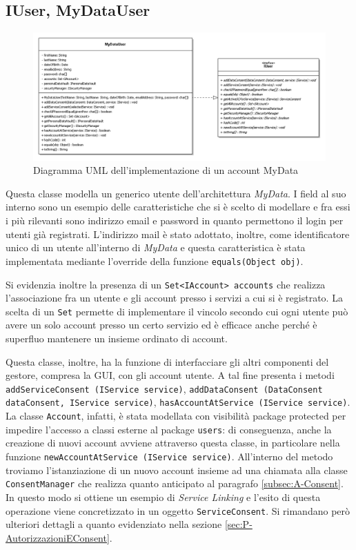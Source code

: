 \subsection{IUser, MyDataUser}
\begin{figure} [h]
	\includegraphics[width=\linewidth]{pictures/Accounting-MyDataUsr.png}
	\caption{Diagramma UML dell'implementazione di un account MyData}
	\label{fig:Accounting-MyDatUsr}
\end{figure}
Questa classe modella un generico utente dell’architettura \textit{MyData}. I field al suo interno sono un esempio delle caratteristiche che si \`e scelto di modellare e fra essi i pi\`u rilevanti sono indirizzo email e password in quanto permettono il login per utenti gi\`a registrati. L’indirizzo mail \`e stato adottato, inoltre, come identificatore unico di un utente all’interno di \textit{MyData} e questa caratteristica \`e stata implementata mediante l’override della funzione \texttt{equals(Object obj)}.

Si evidenzia inoltre la presenza di un \texttt{Set<IAccount> accounts} che realizza l’associazione fra un utente e gli account presso i servizi a cui si \`e registrato. La scelta di un \texttt{Set} permette di implementare il vincolo secondo cui ogni utente pu\`o avere un solo account presso un certo servizio ed \`e efficace anche perch\'e \`e superfluo mantenere un insieme ordinato di account.

Questa classe, inoltre, ha la funzione di interfacciare gli altri componenti del gestore, compresa la GUI, con gli account utente. A tal fine presenta i metodi \texttt{addServiceConsent (IService service)}, \texttt{addDataConsent (DataConsent dataConsent, IService service)}, \texttt{hasAccountAtService (IService service)}.  La classe \texttt{Account}, infatti, \`e stata modellata con visibilit\`a package protected per impedire l’accesso a classi esterne al package \texttt{users}: di conseguenza, anche la creazione di nuovi account avviene attraverso questa classe, in particolare nella funzione \texttt{newAccountAtService (IService service)}. All’interno del metodo troviamo l’istanziazione di un nuovo account insieme ad una chiamata alla classe \texttt{ConsentManager} che realizza quanto anticipato al paragrafo \ref{subsec:A-Consent}. In questo modo si ottiene un esempio di \textit{Service Linking} e l’esito di questa operazione viene concretizzato in un oggetto \texttt{ServiceConsent}. Si rimandano per\`o ulteriori dettagli a quanto evidenziato nella sezione \ref{sec:P-AutorizzazioniEConsent}.

